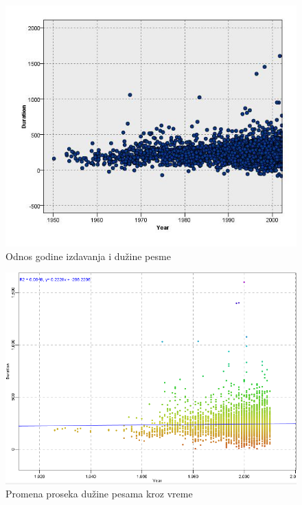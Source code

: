 \begin{figure}[H]
    \centering
    \includegraphics[scale=0.6]{resources/year-duration.jpg}
    \caption{Odnos godine izdavanja i du\v{z}ine pesme}
    \label{fig:YearDuration}
\end{figure}

\begin{figure}[H]
    \centering
    \includegraphics[scale=0.6]{resources/year-duration.PNG}
    \caption{Promena proseka du\v{z}ine pesama kroz vreme}
    \label{fig:YearDurationAvg}
\end{figure}
